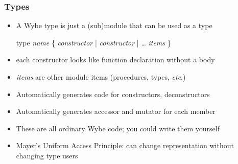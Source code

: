 \documentclass[12pt]{beamer}
\begin{document}
\begin{frame}[fragile]
\frametitle{Types}
\begin{itemize}
\item A Wybe type is just a (sub)module that can be used as a type \\[-1ex]
  \begin{minipage}{0.95\linewidth}
    \begin{block}{}
\begin{semiverbatim}
type \emph{name} \{
    \emph{constructor} | \emph{constructor} | \ldots
    \emph{items}
\}
\end{semiverbatim}
    \end{block}
  \end{minipage}
\item each constructor looks like function declaration without a body
\item \emph{items} are other module items (procedures, types, \emph{etc}.)
\item Automatically generates code for constructors, deconstructors
\item Automatically generates accessor and mutator for each member
\item These are all ordinary Wybe code; you could write them yourself
\item Mayer's Uniform Access Principle: can change representation without
  changing type users
\end{itemize}
\end{frame}
\end{document}

